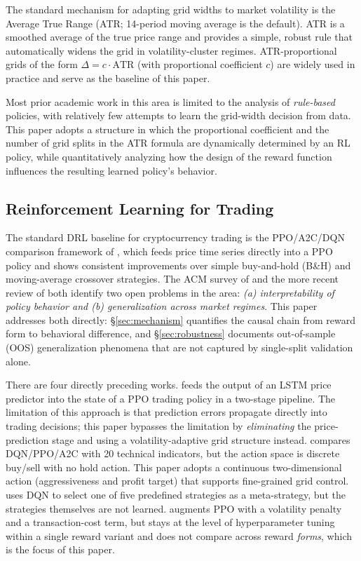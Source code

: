 \documentclass[11pt, a4paper]{article}
\begin{document}
The standard mechanism for adapting grid widths to market volatility is the
Average True Range \citep{wilder1978atr} (ATR; 14-period moving average is the
default). ATR is a smoothed average of the true price range and provides a
simple, robust rule that automatically widens the grid in volatility-cluster
regimes. ATR-proportional grids of the form $\Delta = c \cdot \mathrm{ATR}$
(with proportional coefficient $c$) are widely used in practice and serve as
the baseline of this paper.

Most prior academic work in this area is limited to the analysis of
\emph{rule-based} policies, with relatively few attempts to learn the grid-width
decision from data. This paper adopts a structure in which the proportional
coefficient and the number of grid splits in the ATR formula are dynamically
determined by an RL policy, while quantitatively analyzing how the design of
the reward function influences the resulting learned policy's behavior.

\subsection{Reinforcement Learning for Trading}
\label{sec:related_drl}

The standard DRL baseline for cryptocurrency trading is the PPO/A2C/DQN
comparison framework of \citet{zhang2020drl}, which feeds price time series
directly into a PPO policy and shows consistent improvements over simple
buy-and-hold (B\&H) and moving-average crossover strategies. The ACM survey of
\citet{sun2023rl} and the more recent review of \citet{liu2025review} both
identify two open problems in the area: \emph{(a) interpretability of policy
behavior and (b) generalization across market regimes}. This paper addresses
both directly: \S\ref{sec:mechanism} quantifies the causal chain from reward
form to behavioral difference, and \S\ref{sec:robustness} documents
out-of-sample (OOS) generalization phenomena that are not captured by
single-split validation alone.

There are four directly preceding works. \citet{liu2021bitcoin} feeds the
output of an LSTM price predictor into the state of a PPO trading policy in a
two-stage pipeline. The limitation of this approach is that prediction errors
propagate directly into trading decisions; this paper bypasses the limitation
by \emph{eliminating} the price-prediction stage and using a volatility-adaptive
grid structure instead. \citet{yasin2024rl} compares DQN/PPO/A2C with 20
technical indicators, but the action space is discrete buy/sell with no hold
action. This paper adopts a continuous two-dimensional action (aggressiveness
and profit target) that supports fine-grained grid control.
\citet{pham2025dqn} uses DQN to select one of five predefined strategies as a
meta-strategy, but the strategies themselves are not learned.
\citet{bandarupalli2025risk} augments PPO with a volatility penalty and a
transaction-cost term, but stays at the level of hyperparameter tuning within
a single reward variant and does not compare across reward \emph{forms}, which
is the focus of this paper.
\end{document}
